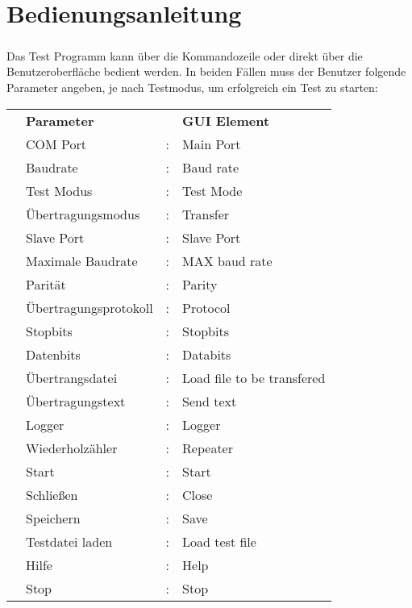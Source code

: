 \chapter{Bedienungsanleitung}\label{chp:bedienungsanleitung}


\paragraph{}
Das Test Programm kann über die Kommandozeile oder direkt über die Benutzeroberfläche bedient werden. In beiden Fällen muss der Benutzer folgende Parameter angeben, je nach Testmodus, um erfolgreich ein Test zu starten:
\\
\begin{tabular}{llll}
\\ &\textbf{Parameter} & &\textbf{GUI Element}
\\ &COM Port &: &Main Port
\\ &Baudrate &: &Baud rate
\\ &Test Modus &: &Test Mode
\\ &Übertragungsmodus &: &Transfer
\\ &Slave Port &: &Slave Port
\\ &Maximale Baudrate &: &MAX baud rate
\\ &Parität &: &Parity
\\ &Übertragungsprotokoll &: &Protocol
\\ &Stopbits &: &Stopbits
\\ &Datenbits &: &Databits
\\ &Übertrangsdatei &: &Load file to be transfered
\\ &Übertragungstext &: &Send text
\\ &Logger &: &Logger
\\ &Wiederholzähler &: &Repeater
\\ &Start &: &Start
\\ &Schließen &: &Close
\\ &Speichern &: &Save
\\ &Testdatei laden &: &Load test file
\\ &Hilfe &: &Help
\\ &Stop &: &Stop
\end{tabular}


